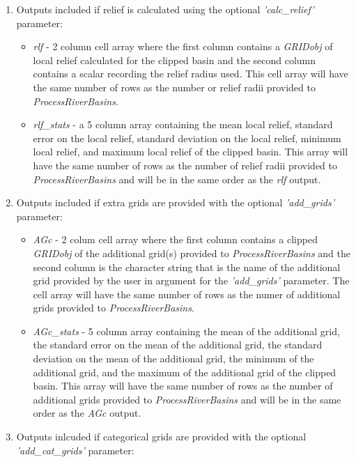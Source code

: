 \begin{enumerate}
\begin{itemize}
	\end{itemize}
	\item Outputs included if relief is calculated using the optional \textit{'calc\_relief'} parameter:
	\begin{itemize}
		\item \textit{rlf} - 2 column cell array where the first column contains a \textit{GRIDobj} of local relief calculated for the clipped basin and the second column contains a scalar recording the relief radius used. This cell array will have the same number of rows as the number or relief radii provided to \textit{ProcessRiverBasins}.
		\item \textit{rlf\_stats} - a 5 column array containing the mean local relief, standard error on the local relief, standard deviation on the local relief, minimum local relief, and maximum local relief of the clipped basin. This array will have the same number of rows as the number of relief radii provided to \textit{ProcessRiverBasins} and will be in the same order as the \textit{rlf} output.
	\end{itemize}
	\item Outputs included if extra grids are provided with the optional \textit{'add\_grids'} parameter:
	\begin{itemize}
		\item \textit{AGc} - 2 colum cell array where the first column contains a clipped \textit{GRIDobj} of the additional grid(s) provided to \textit{ProcessRiverBasins} and the second column is the character string that is the name of the additional grid provided by the user in argument for the \textit{'add\_grids'} parameter. The cell array will have the same number of rows as the numer of additional grids provided to \textit{ProcessRiverBasins}.
		\item \textit{AGc\_stats} - 5 column array containing the mean of the additional grid, the standard error on the mean of the additional grid, the standard deviation on the mean of the additional grid, the minimum of the additional grid, and the maximum of the additional grid of the clipped basin. This array will have the same number of rows as the number of additional grids provided to \textit{ProcessRiverBasins} and will be in the same order as the \textit{AGc} output.
	\end{itemize}
	\item Outputs inlcuded if categorical grids are provided with the optional \textit{'add\_cat\_grids'} parameter:
	\begin{itemize}

\end{itemize}
\end{enumerate}
